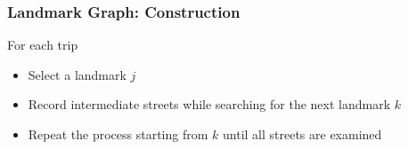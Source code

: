\documentclass{beamer}
\theoremstyle{definition}
\begin{document}
\begin{frame}
\frametitle{Landmark Graph: Construction}
For each trip
\begin{itemize}
	\item Select a landmark $j$
	\item Record intermediate streets while searching for the next landmark $k$
	\item Repeat the process starting from $k$ until all streets are examined
\end{itemize}
\end{frame}
%
%
%
\end{document}
